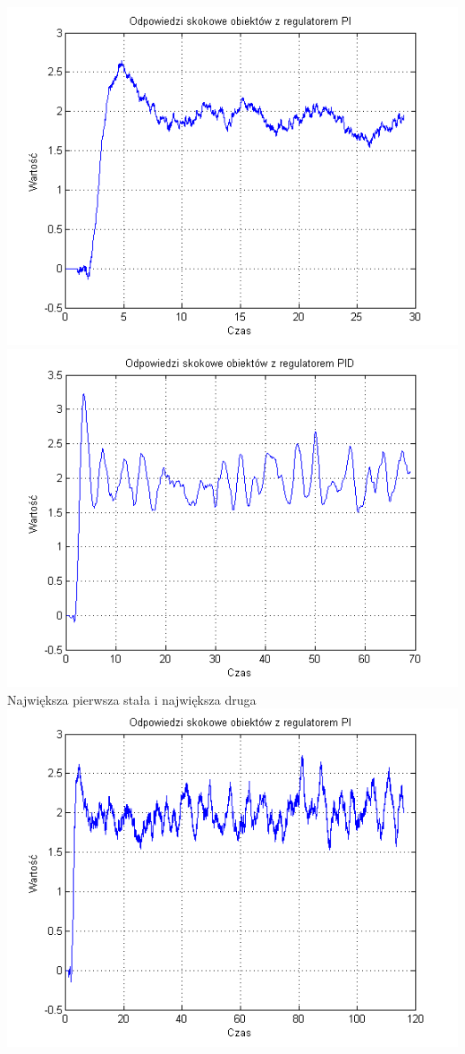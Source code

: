 \documentclass[10pt,a4paper]{article}
\begin{document}
\includegraphics[scale=1]{images/trzy/skrypt_14.png}\\
\includegraphics[scale=1]{images/cztery/skrypt_14.png}\\
\newpage
Największa pierwsza stała i największa druga\\
\includegraphics[scale=1]{images/trzy/skrypt_15.png}\\
\end{document}
